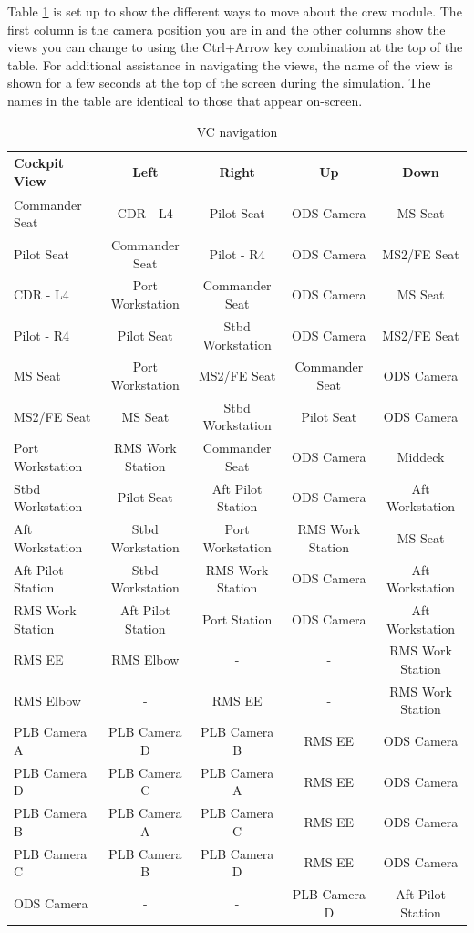 \documentclass[13pt]{article}
\begin{document}
\begin{multicols*}{2}
Table \ref{tab:VC_navigation} is set up to show the different ways to move about the crew module. The first column is the camera position you are in and the other columns show the views you can change to using the Ctrl+Arrow key combination at the top of the table. For additional assistance in navigating the views, the name of the view is shown for a few seconds at the top of the screen during the simulation. The names in the table are identical to those that appear on-screen.\\
\end{multicols*}
\begin{table}[H]
  \centering
  \begin{tabular}{l|c c c c }
	Cockpit View & Left & Right & Up & Down \\
	\hline
	Commander Seat & CDR - L4 & Pilot Seat & ODS Camera & MS Seat \\
	Pilot Seat & Commander Seat & Pilot - R4 & ODS Camera & MS2/FE Seat \\
	CDR - L4 & Port Workstation & Commander Seat & ODS Camera & MS Seat \\
	Pilot - R4 & Pilot Seat & Stbd Workstation & ODS Camera & MS2/FE Seat \\
	MS Seat & Port Workstation & MS2/FE Seat & Commander Seat & ODS Camera\\
	MS2/FE Seat & MS Seat & Stbd Workstation & Pilot Seat & ODS Camera\\
	Port Workstation & RMS Work Station & Commander Seat & ODS Camera & Middeck\\
	Stbd Workstation & Pilot Seat & Aft Pilot Station & ODS Camera & Aft Workstation\\
	Aft Workstation & Stbd Workstation & Port Workstation & RMS Work Station & MS Seat\\
	Aft Pilot Station & Stbd Workstation & RMS Work Station & ODS Camera & Aft Workstation\\
	RMS Work Station & Aft Pilot Station & Port Station & ODS Camera & Aft Workstation\\
	RMS EE & RMS Elbow & - & - & RMS Work Station\\
	RMS Elbow & - & RMS EE & - & RMS Work Station\\
	PLB Camera A & PLB Camera D & PLB Camera B & RMS EE & ODS Camera\\
	PLB Camera D & PLB Camera C & PLB Camera A & RMS EE & ODS Camera\\
	PLB Camera B & PLB Camera A & PLB Camera C & RMS EE & ODS Camera\\
	PLB Camera C & PLB Camera B & PLB Camera D & RMS EE & ODS Camera\\
	ODS Camera & - & - & PLB Camera D & Aft Pilot Station\\
  \end{tabular}
  \caption{VC navigation}
  \label{tab:VC_navigation}
\end{table}
\newpage
\end{document}
